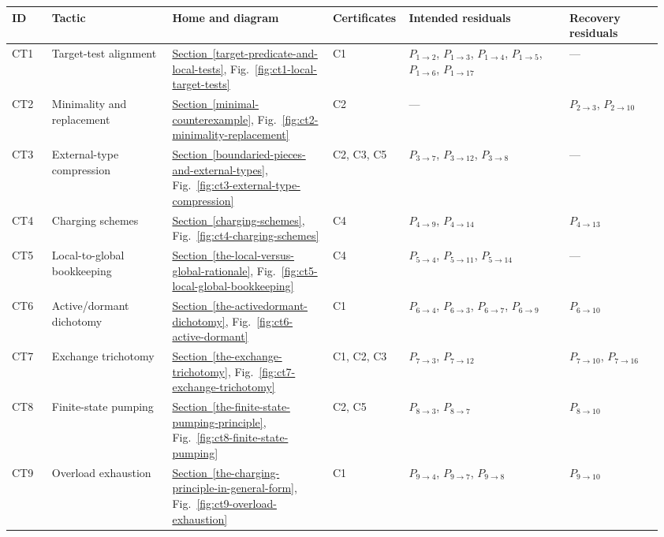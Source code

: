 \documentclass[
  11pt,
]{article}
\theoremstyle{definition}
\newcommand{\secref}[1]{\hyperref[#1]{Section~\ref*{#1}}}
\begin{document}
\begingroup
\tiny
\setlength{\tabcolsep}{1.1pt}
\begin{longtable}[]{@{}
  >{\raggedright\arraybackslash}p{0.06\linewidth}
  >{\raggedright\arraybackslash}p{0.18\linewidth}
  >{\raggedright\arraybackslash}p{0.24\linewidth}
  >{\raggedright\arraybackslash}p{0.10\linewidth}
  >{\raggedright\arraybackslash}p{0.24\linewidth}
  >{\raggedright\arraybackslash}p{0.14\linewidth}@{}}
\toprule\noalign{}
ID & Tactic & Home and diagram & Certificates & Intended residuals & Recovery residuals \\
\midrule\noalign{}
\endhead
\bottomrule\noalign{}
\endlastfoot
CT1 & Target-test alignment & \secref{target-predicate-and-local-tests}, Fig.~\ref{fig:ct1-local-target-tests} & C1 & \(P_{1\to2}\), \(P_{1\to3}\), \(P_{1\to4}\), \(P_{1\to5}\), \(P_{1\to6}\), \(P_{1\to17}\) & --- \\
CT2 & Minimality and replacement & \secref{minimal-counterexample}, Fig.~\ref{fig:ct2-minimality-replacement} & C2 & --- & \(P_{2\to3}\), \(P_{2\to10}\) \\
CT3 & External-type compression & \secref{boundaried-pieces-and-external-types}, Fig.~\ref{fig:ct3-external-type-compression} & C2, C3, C5 & \(P_{3\to7}\), \(P_{3\to12}\), \(P_{3\to8}\) & --- \\
CT4 & Charging schemes & \secref{charging-schemes}, Fig.~\ref{fig:ct4-charging-schemes} & C4 & \(P_{4\to9}\), \(P_{4\to14}\) & \(P_{4\to13}\) \\
CT5 & Local-to-global bookkeeping & \secref{the-local-versus-global-rationale}, Fig.~\ref{fig:ct5-local-global-bookkeeping} & C4 & \(P_{5\to4}\), \(P_{5\to11}\), \(P_{5\to14}\) & --- \\
CT6 & Active/dormant dichotomy & \secref{the-activedormant-dichotomy}, Fig.~\ref{fig:ct6-active-dormant} & C1 & \(P_{6\to4}\), \(P_{6\to3}\), \(P_{6\to7}\), \(P_{6\to9}\) & \(P_{6\to10}\) \\
CT7 & Exchange trichotomy & \secref{the-exchange-trichotomy}, Fig.~\ref{fig:ct7-exchange-trichotomy} & C1, C2, C3 & \(P_{7\to3}\), \(P_{7\to12}\) & \(P_{7\to10}\), \(P_{7\to16}\) \\
CT8 & Finite-state pumping & \secref{the-finite-state-pumping-principle}, Fig.~\ref{fig:ct8-finite-state-pumping} & C2, C5 & \(P_{8\to3}\), \(P_{8\to7}\) & \(P_{8\to10}\) \\
CT9 & Overload exhaustion & \secref{the-charging-principle-in-general-form}, Fig.~\ref{fig:ct9-overload-exhaustion} & C1 & \(P_{9\to4}\), \(P_{9\to7}\), \(P_{9\to8}\) & \(P_{9\to10}\) \\

\end{longtable}
\end{document}
